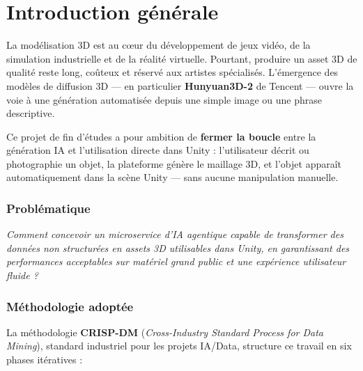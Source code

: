 \documentclass[12pt,a4paper,oneside]{report}
\begin{document}
\cleardoublepage
\chapter*{Introduction générale}

La modélisation 3D est au cœur du développement de jeux vidéo, de la
simulation industrielle et de la réalité virtuelle. Pourtant, produire un
asset 3D de qualité reste long, coûteux et réservé aux artistes spécialisés.
L'émergence des modèles de diffusion 3D — en particulier \textbf{Hunyuan3D-2}
de Tencent — ouvre la voie à une génération automatisée depuis une simple
image ou une phrase descriptive.

Ce projet de fin d'études a pour ambition de \textbf{fermer la boucle} entre
la génération IA et l'utilisation directe dans Unity : l'utilisateur décrit
ou photographie un objet, la plateforme génère le maillage 3D, et l'objet
apparaît automatiquement dans la scène Unity — sans aucune manipulation manuelle.

\subsection*{Problématique}
\textit{Comment concevoir un microservice d'IA agentique capable de
transformer des données non structurées en assets 3D utilisables dans Unity,
en garantissant des performances acceptables sur matériel grand public et
une expérience utilisateur fluide ?}

\subsection*{Méthodologie adoptée}
La méthodologie \textbf{CRISP-DM} (\textit{Cross-Industry Standard Process
for Data Mining}), standard industriel pour les projets IA/Data, structure
ce travail en six phases itératives :
\end{document}
